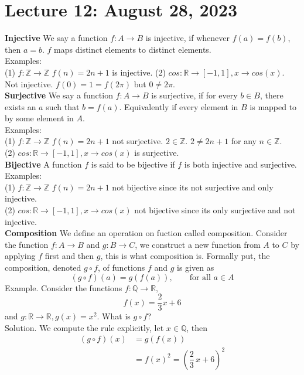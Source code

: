 \documentclass{article}
\begin{document}
\section{Lecture 12: August 28, 2023}
\textbf{Injective} We say a function \(f: A \to B\) is injective, if whenever \(f(a) = f(b)\), then \(a = b\). \(f\) maps distinct elements to distinct elements.\\
Examples:\\
(1) \(f: \mathbb{Z} \to \mathbb{Z}\) \(f(n) = 2n+1\) is injective.
(2) \(cos: \mathbb{R} \to [-1,1], x \to cos(x)\). Not injective. \(f(0) = 1  = f(2\pi)\) but \(0 \neq 2\pi\).\\
\textbf{Surjective} We say a function \(f: A \to B\) is surjective, if for every \(b \in B\), there exists an \(a\) such that \(b = f(a)\). Equivalently if every element in \(B\) is mapped to by some element in \(A\).\\
Examples:\\
(1)  \(f: \mathbb{Z} \to \mathbb{Z}\) \(f(n) = 2n+1\) not surjective. \(2 \in \mathbb{Z}\). \(2 \neq 2n+1\) for any \(n \in \mathbb{Z}\).\\
(2) \(cos: \mathbb{R} \to [-1,1], x \to cos(x)\) is surjective.\\
\textbf{Bijective} A function \(f\) is said to be bijective if \(f\) is both injective and surjective.\\
Examples:\\
(1) \(f: \mathbb{Z} \to \mathbb{Z}\) \(f(n) = 2n+1\) not bijective since its not surjective and only injective.\\
(2) \(cos: \mathbb{R} \to [-1,1], x \to cos(x)\) not bijective since its only surjective and not injective.\\
\textbf{Composition} We define an operation on fuction called composition. Consider the function \(f: A \to B\) and \(g: B \to C\), we construct a new function from \(A\) to \(C\) by applying \(f\) first and then \(g\), this is what composition is. Formally put, the composition, denoted \(g\circ f\), of functions \(f\) and \(g\) is given as 
\[(g\circ f)(a) = g(f(a)),\qquad \text{for all }a \in A\]
Example. Consider the functions \(f: \mathbb{Q} \to \mathbb{R},\)
\[f(x) = \frac{2}{3}x+6\]
and \(g: \mathbb{R} \to \mathbb{R}, g(x) = x^2\). What is \(g\circ f\)?\\
Solution. We compute the rule explicitly, let \(x \in \mathbb{Q}\), then
\begin{align*} (g\circ f)(x) &= g(f(x))\\[0.5em] &= f(x)^2 = \left(\dfrac{2}{3}\,x + 6\right)^2 \end{align*}
\end{document}
